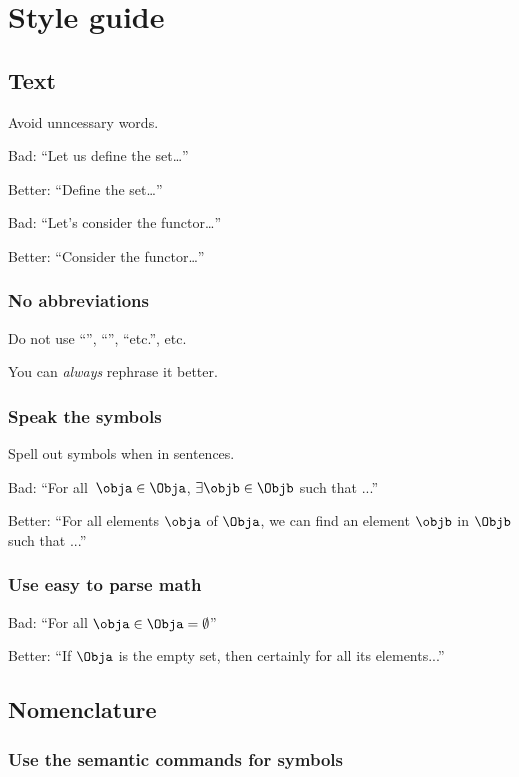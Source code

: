 \section*{Style guide}
\subsection*{Text}


Avoid unncessary words.

Bad: ``Let us define the set\dots''

Better: ``Define the set\dots''

Bad: ``Let's consider the functor\dots''

Better: ``Consider the functor\dots ''


\subsubsection*{No abbreviations}
Do not use ``\ie '', ``\eg '', ``etc.'', etc.

You can \emph{always} rephrase it better.

\subsubsection*{Speak the symbols}
Spell out symbols when in sentences.

Bad: ``For all~$\obja\in \Obja$, $\exists \objb \in \Objb$ such that ...''

Better: ``For all elements $\obja$ of $\Obja$, we can find an element $\objb$ in $\Objb$ such that ...''

\subsubsection*{Use easy to parse math}

Bad: ``For all $\obja\in \Obja=\emptyset$''

Better: ``If $\Obja$ is the empty set, then certainly for all its elements...''

\subsection*{Nomenclature}

\subsubsection*{Use the semantic commands for symbols}

